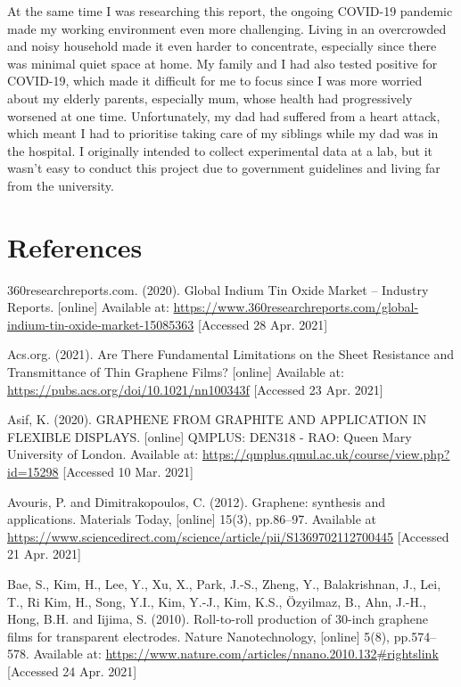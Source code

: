 \documentclass[a4paper,12pt]{article}
\numberwithin{equation}{section}
\numberwithin{figure}{section}
\begin{document}
\noindent At the same time I was researching this report, the ongoing COVID-19 pandemic made my working environment even more challenging. Living in an overcrowded and noisy household made it even harder to concentrate, especially since there was minimal quiet space at home. My family and I had also tested positive for COVID-19, which made it difficult for me to focus since I was more worried about my elderly parents, especially mum, whose health had progressively worsened at one time. Unfortunately, my dad had suffered from a heart attack, which meant I had to prioritise taking care of my siblings while my dad was in the hospital. I originally intended to collect experimental data at a lab, but it wasn't easy to conduct this project due to government guidelines and living far from the university.

\newpage
\section*{References}
{}

\noindent 360researchreports.com. (2020). Global Indium Tin Oxide Market – Industry Reports. [online] Available at: \url{https://www.360researchreports.com/global-indium-tin-oxide-market-15085363} [Accessed 28 Apr. 2021]\vspace{\baselineskip}

\noindent Acs.org. (2021). Are There Fundamental Limitations on the Sheet Resistance and Transmittance of Thin Graphene Films? [online] Available at: \url{https://pubs.acs.org/doi/10.1021/nn100343f} [Accessed 23 Apr. 2021]\vspace{\baselineskip}

\noindent Asif, K. (2020). GRAPHENE FROM GRAPHITE AND APPLICATION IN FLEXIBLE DISPLAYS. [online] QMPLUS: DEN318 - RAO: Queen Mary University of London. Available at: \url{https://qmplus.qmul.ac.uk/course/view.php?id=15298} [Accessed 10 Mar. 2021]\vspace{\baselineskip}

\noindent Avouris, P. and Dimitrakopoulos, C. (2012). Graphene: synthesis and applications. Materials Today, [online] 15(3), pp.86–97. Available at \url{https://www.sciencedirect.com/science/article/pii/S1369702112700445} [Accessed 21 Apr. 2021]\vspace{\baselineskip}

\noindent Bae, S., Kim, H., Lee, Y., Xu, X., Park, J.-S., Zheng, Y., Balakrishnan, J., Lei, T., Ri Kim, H., Song, Y.I., Kim, Y.-J., Kim, K.S., Özyilmaz, B., Ahn, J.-H., Hong, B.H. and Iijima, S. (2010). Roll-to-roll production of 30-inch graphene films for transparent electrodes. Nature Nanotechnology, [online] 5(8), pp.574–578. Available at: \url{https://www.nature.com/articles/nnano.2010.132#rightslink} [Accessed 24 Apr. 2021]\vspace{\baselineskip}
\end{document}
